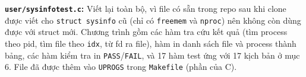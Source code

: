 \item \textbf{\texttt{user/sysinfotest.c}:} Viết lại toàn bộ, vì file có sẵn trong repo sau khi clone được viết cho \texttt{struct sysinfo} cũ (chỉ có \texttt{freemem} và \texttt{nproc}) nên không còn dùng được với struct mới. Chương trình gồm các hàm tra cứu kết quả (tìm process theo pid, tìm file theo \texttt{idx}, từ fd ra file), hàm in danh sách file và process thành bảng, các hàm kiểm tra in \texttt{PASS}/\texttt{FAIL}, và 17 hàm test ứng với 17 kịch bản ở mục 6. File đã được thêm vào \texttt{UPROGS} trong \texttt{Makefile} (phần của C).
